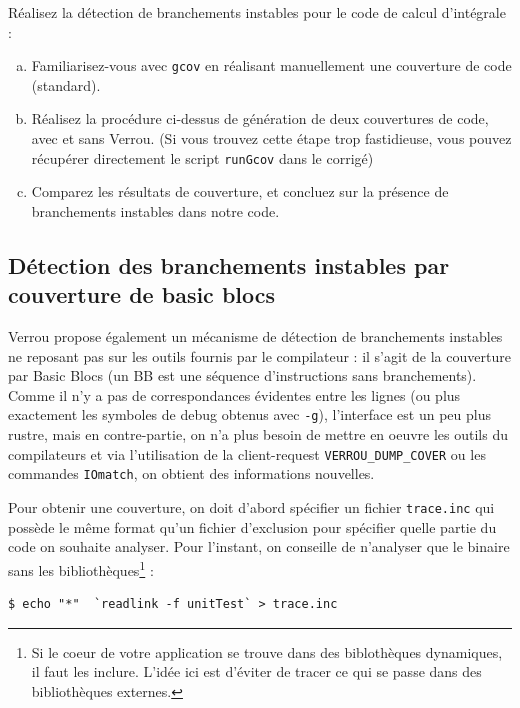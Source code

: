 \documentclass[a4paper]{article}
\newcounter{Question}
\newenvironment{question}[1][\unskip]{
  \bigskip
  \stepcounter{Question}
  \def\questionTitle{ #1}
  \begin{mdframed}[style=question]
  }{
  \end{mdframed}
}
\begin{document}
\begin{question}
  Réalisez la détection de branchements instables pour le code de
  calcul d'intégrale :
  \begin{enumerate}[(a)]
  \item Familiarisez-vous avec \texttt{gcov} en réalisant manuellement une
    couverture de code (standard).
  \item Réalisez la procédure ci-dessus de génération de deux couvertures de
    code, avec et sans Verrou. (Si vous trouvez cette étape trop fastidieuse,
    vous pouvez récupérer directement le script \texttt{runGcov} dans le
    corrigé)
  \item Comparez les résultats de couverture, et concluez sur la présence de
    branchements instables dans notre code.
  \end{enumerate}
\end{question}

\subsection{Détection des branchements instables par couverture de basic blocs}

 Verrou propose également un mécanisme de détection de branchements instables
 ne reposant pas sur les outils fournis par le compilateur : il s'agit de la couverture par
 Basic Blocs (un BB est une séquence d'instructions sans branchements). Comme il n'y a pas de
 correspondances évidentes entre les lignes (ou plus exactement les symboles de debug obtenus
 avec \texttt{-g}), l'interface est un peu plus rustre, mais en contre-partie, on n'a plus besoin de
 mettre en oeuvre les outils du compilateurs et via l'utilisation de la client-request
 \texttt{VERROU\_DUMP\_COVER} ou les commandes \texttt{IOmatch}, on obtient des informations nouvelles.

 
 Pour obtenir une couverture, on doit d'abord spécifier un fichier \texttt{trace.inc} qui possède le même format qu'un fichier
 d'exclusion pour spécifier quelle partie du code on souhaite
 analyser. Pour l'instant, on conseille de n'analyser que le binaire
 sans les bibliothèques\footnote{Si le coeur de votre application se
   trouve dans des biblothèques dynamiques, il faut les
   inclure. L'idée ici est d'éviter de tracer ce qui se passe dans des
 bibliothèques externes.} :
\begin{verbatim}
$ echo "*"  `readlink -f unitTest` > trace.inc
\end{verbatim}
\end{document}
